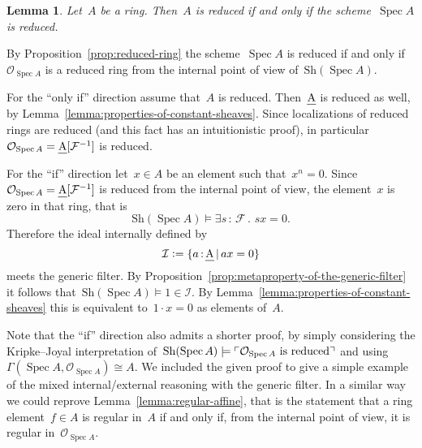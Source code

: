 \documentclass[10pt,reqno,a4paper]{amsbook}
\makeatletter
\theoremstyle{definition}
\theoremstyle{plain}
\newtheorem{lemma}[defn]{Lemma}
\theoremstyle{remark}
\newcommand{\F}{\mathcal{F}}
\renewcommand{\O}{\mathcal{O}}
\newcommand{\I}{\mathcal{I}}
\let\oldul\ul
\renewcommand{\ul}[1]{\text{\oldul{$#1$}}}
\newcommand{\Sh}{\mathrm{Sh}}
\DeclareMathOperator{\Spec}{Spec}
\newcommand{\?}{\,{:}\,}
\renewcommand{\_}{\mathpunct{.}\,}
\newcommand{\speak}[1]{\ulcorner\text{\textnormal{#1}}\urcorner}
\newcommand{\defeq}{\vcentcolon=}
\renewenvironment{proof}[1][\proofname]{\par
  \pushQED{\qed}%
  \normalfont \topsep6\p@\@plus6\p@\relax
  \trivlist
  \item[\hskip\labelsep
        \itshape
    #1\@addpunct{.}]\ignorespaces
}{%
  \popQED\endtrivlist\@endpefalse
}
\makeatother
\begin{document}
\begin{lemma}Let~$A$ be a ring. Then~$A$ is reduced if and only if the
scheme~$\Spec A$ is reduced.\end{lemma}
\begin{proof}By Proposition~\ref{prop:reduced-ring} the scheme~$\Spec A$ is
reduced if and only if~$\O_{\Spec A}$ is a reduced ring
from the internal point of view of~$\Sh(\Spec A)$.

For the ``only if'' direction assume that~$A$ is reduced. Then~$\ul{A}$ is
reduced as well, by Lemma~\ref{lemma:properties-of-constant-sheaves}. Since
localizations of reduced rings are reduced (and this fact has an intuitionistic
proof), in particular~$\O_{\Spec A} = \ul{A}[\F^{-1}]$ is reduced.

For the ``if'' direction let~$x \in A$ be an element such that~$x^n = 0$.
Since~$\O_{\Spec A} = \ul{A}[\F^{-1}]$ is reduced from the internal point of
view, the element~$x$ is zero in that ring, that is
\[ \Sh(\Spec A) \models \exists s\?\F\_ sx = 0. \]
Therefore the ideal internally defined by
\[ \I \defeq \{ a\?\ul{A} \,|\, ax = 0 \} \]
meets the generic filter. By
Proposition~\ref{prop:metaproperty-of-the-generic-filter} it follows
that~$\Sh(\Spec A) \models 1 \in \I$. By
Lemma~\ref{lemma:properties-of-constant-sheaves} this is equivalent to~$1 \cdot
x = 0$ as elements of~$A$.
\end{proof}

Note that the ``if'' direction also admits a shorter proof, by simply
considering the Kripke--Joyal interpretation of~$\Sh(\Spec A) \models
\speak{$\O_{\Spec A}$ is reduced}$ and using~$\Gamma(\Spec A, \O_{\Spec A})
\cong A$. We included the given proof to give a simple example of the mixed
internal/external reasoning with the generic filter. In a similar way we could
reprove Lemma~\ref{lemma:regular-affine}, that is the statement that a ring
element~$f \in A$ is regular in~$A$ if and only if, from the internal point of
view, it is regular in~$\O_{\Spec A}$.
\end{document}
